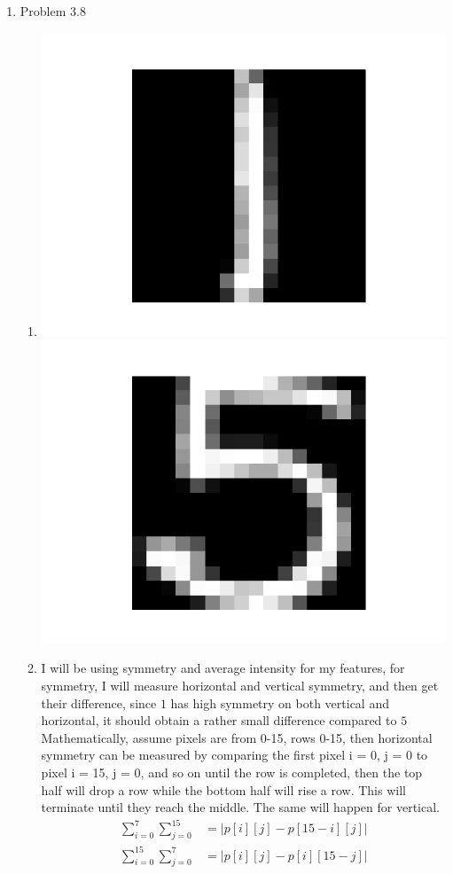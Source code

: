 \documentclass{article}
\begin{document}
\begin{enumerate}
        \item Problem 3.8
        \begin{enumerate}[label=(\alph*)]
            \item \includegraphics[scale=0.5]{images/3_8_1.png}\\ \includegraphics[scale=0.5]{images/3_8_5.png}
            \item I will be using symmetry and average intensity for my features, for symmetry, I will measure horizontal and vertical symmetry, and then get their difference, since $1$ has high symmetry on both vertical and horizontal, it should obtain a rather small difference compared to $5$\\[0.25in]
            Mathematically, assume pixels are from 0-15, rows 0-15, then horizontal symmetry can be measured by comparing the first pixel i = 0, j = 0 to pixel i = 15, j = 0, and so on until the row is completed, then the top half will drop a row while the bottom half will rise a row. This will terminate until they reach the middle. The same will happen for vertical.
            \begin{align}
                \sum_{i = 0}^{7} \sum_{j = 0}^{15} &= | p[i][j] - p[15 - i][j] |\\
                \sum_{i = 0}^{15} \sum_{j = 0}^{7} &= | p[i][j] - p[i][15 - j] |
            \end{align}


\end{enumerate}
\end{enumerate}
\end{document}
